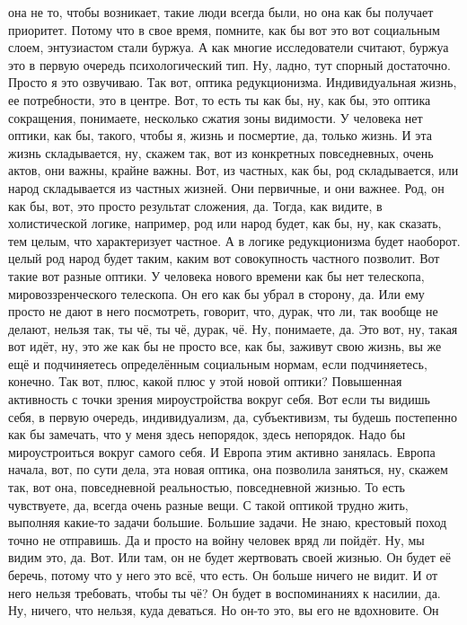 она не то, чтобы возникает, такие люди всегда были, но она как бы получает
приоритет. Потому что в свое время, помните, как бы вот это вот социальным
слоем, энтузиастом стали буржуа. А как многие исследователи считают, буржуа это
в первую очередь психологический тип. Ну, ладно, тут спорный достаточно. Просто
я это озвучиваю. Так вот, оптика редукционизма. Индивидуальная жизнь, ее
потребности, это в центре. Вот, то есть ты как бы, ну, как бы, это оптика
сокращения, понимаете, несколько сжатия зоны видимости. У человека нет оптики,
как бы, такого, чтобы я, жизнь и посмертие, да, только жизнь. И эта жизнь
складывается, ну, скажем так, вот из конкретных повседневных, очень актов, они
важны, крайне важны. Вот, из частных, как бы, род складывается, или народ
складывается из частных жизней. Они первичные, и они важнее. Род, он как бы,
вот, это просто результат сложения, да. Тогда, как видите, в холистической
логике, например, род или народ будет, как бы, ну, как сказать, тем целым, что
характеризует частное. А в логике редукционизма будет наоборот. целый род народ
будет таким, каким вот совокупность частного позволит. Вот такие вот разные
оптики. У человека нового времени как бы нет телескопа, мировоззренческого
телескопа. Он его как бы убрал в сторону, да. Или ему просто не дают в него
посмотреть, говорит, что, дурак, что ли, так вообще не делают, нельзя так, ты
чё, ты чё, дурак, чё. Ну, понимаете, да. Это вот, ну, такая вот идёт, ну, это же
как бы не просто все, как бы, заживут свою жизнь, вы же ещё и подчиняетесь
определённым социальным нормам, если подчиняетесь, конечно. Так вот, плюс, какой
плюс у этой новой оптики? Повышенная активность с точки зрения мироустройства
вокруг себя. Вот если ты видишь себя, в первую очередь, индивидуализм, да,
субъективизм, ты будешь постепенно как бы замечать, что у меня здесь непорядок,
здесь непорядок. Надо бы мироустроиться вокруг самого себя. И Европа этим
активно занялась. Европа начала, вот, по сути дела, эта новая оптика, она
позволила заняться, ну, скажем так, вот она, повседневной реальностью,
повседневной жизнью. То есть чувствуете, да, всегда очень разные вещи. С такой
оптикой трудно жить, выполняя какие-то задачи большие. Большие задачи. Не знаю,
крестовый поход точно не отправишь. Да и просто на войну человек вряд ли пойдёт.
Ну, мы видим это, да. Вот. Или там, он не будет жертвовать своей жизнью. Он
будет её беречь, потому что у него это всё, что есть. Он больше ничего не видит.
И от него нельзя требовать, чтобы ты чё? Он будет в воспоминаниях к насилии, да.
Ну, ничего, что нельзя, куда деваться. Но он-то это, вы его не вдохновите. Он

